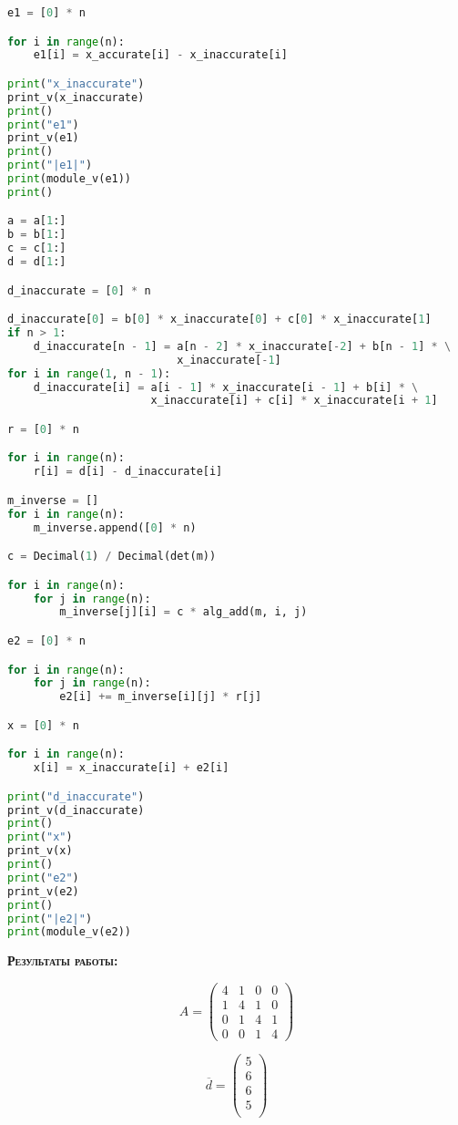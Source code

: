 \documentclass [12pt]{article}
\begin{document}
\begin{lstlisting}[language=python]
e1 = [0] * n

for i in range(n):
    e1[i] = x_accurate[i] - x_inaccurate[i]

print("x_inaccurate")
print_v(x_inaccurate)
print()
print("e1")
print_v(e1)
print()
print("|e1|")
print(module_v(e1))
print()

a = a[1:]
b = b[1:]
c = c[1:]
d = d[1:]

d_inaccurate = [0] * n

d_inaccurate[0] = b[0] * x_inaccurate[0] + c[0] * x_inaccurate[1]
if n > 1:
    d_inaccurate[n - 1] = a[n - 2] * x_inaccurate[-2] + b[n - 1] * \
                          x_inaccurate[-1]
for i in range(1, n - 1):
    d_inaccurate[i] = a[i - 1] * x_inaccurate[i - 1] + b[i] * \
                      x_inaccurate[i] + c[i] * x_inaccurate[i + 1]

r = [0] * n

for i in range(n):
    r[i] = d[i] - d_inaccurate[i]

m_inverse = []
for i in range(n):
    m_inverse.append([0] * n)

c = Decimal(1) / Decimal(det(m))

for i in range(n):
    for j in range(n):
        m_inverse[j][i] = c * alg_add(m, i, j)

e2 = [0] * n

for i in range(n):
    for j in range(n):
        e2[i] += m_inverse[i][j] * r[j]

x = [0] * n

for i in range(n):
    x[i] = x_inaccurate[i] + e2[i]

print("d_inaccurate")
print_v(d_inaccurate)
print()
print("x")
print_v(x)
print()
print("e2")
print_v(e2)
print()
print("|e2|")
print(module_v(e2))


\end{lstlisting}


\textsc{\textbf{Результаты работы:}}

$$A = \left(\begin{array}{cccc}
4 & 1 & 0 & 0 \\
1 & 4 & 1 & 0 \\
0 & 1 & 4 & 1 \\
0 & 0 & 1 & 4
\end{array}\right) $$

$$\overline{d} = \left(\begin{array}{c}
5 \\
6 \\
6 \\
5 \\
\end{array}\right)$$
\end{document}
